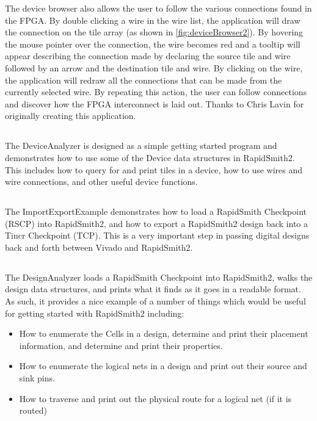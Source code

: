 The device browser also allows the user to follow the various connections found
in the FPGA.  By double clicking a wire in the wire list, the application will
draw the connection on the tile array (as shown in
\autoref{fig:deviceBrowser2}). By hovering the mouse pointer over the
connection, the wire becomes red and a tooltip will appear describing the
connection made by declaring the source tile and wire followed by an arrow and
the destination tile and wire.  By clicking on the wire, the application will
redraw all the connections that can be made from the currently selected wire. 
By repeating this action, the user can follow connections and discover how the
FPGA interconnect is laid out. Thanks to Chris Lavin for originally creating
this application.

\subsection{}
The DeviceAnalyzer is designed as a simple getting started program and
demonstrates how to use some of the Device data structures in RapidSmith2. This
includes how to query for and print tiles in a device, how to use wires and
wire connections, and other useful device functions.

\subsection{} \label{sec:importExportExample}
The ImportExportExample demonstrates how to load a RapidSmith Checkpoint
(RSCP) into RapidSmith2, and how to export a RapidSmith2 design back into a Tincr
Checkpoint (TCP). This is a very important step in passing digital designs back
and forth between Vivado and RapidSmith2.

\subsection{}
The DesignAnalyzer loads a RapidSmith Checkpoint into RapidSmith2, walks
the design data structures, and prints what it finds as it goes in a
readable format. As such, it provides a nice example of a number of things which would
be useful for getting started with RapidSmith2 including:
\begin{itemize}
  \item How to enumerate the Cells in a design, determine and print their 
  placement information, and determine and print their properties.
  \item How to enumerate the logical nets in a design and print out their source
  and sink pins. 
  \item How to traverse and print out the physical route for a logical net (if
  it is routed)  
\end{itemize}

